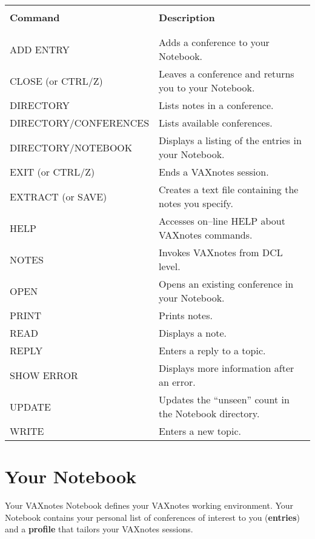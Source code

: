 \begin{tabular}{ l l }
& \\
\hline
& \\
{\large \bf Command}  & {\large \bf Description} \\
& \\
\hline
& \\
ADD ENTRY                &Adds a conference to your Notebook.\\
CLOSE (or CTRL/Z)        &Leaves a conference and returns you to your Notebook.\\
DIRECTORY                &Lists notes in a conference.\\
DIRECTORY/CONFERENCES    &Lists available conferences.\\
DIRECTORY/NOTEBOOK       &Displays a listing of the entries in your Notebook.\\
EXIT (or CTRL/Z)         &Ends a VAXnotes session.\\
EXTRACT (or SAVE)        &Creates a text file containing the notes you specify.\\
HELP                     &Accesses on--line HELP about VAXnotes commands.\\
NOTES                    &Invokes VAXnotes from DCL level.\\
OPEN                     &Opens an existing conference in your Notebook.\\
PRINT                    &Prints notes.\\
READ                     &Displays a note.\\
REPLY                    &Enters a reply to a topic.\\
SHOW ERROR               &Displays more information after an error.\\
UPDATE                   &Updates the ``unseen'' count in the Notebook directory.\\
WRITE                    &Enters a new topic.\\

\end{tabular}

\section {Your Notebook}

Your VAXnotes Notebook defines your VAXnotes working environment. Your Notebook
contains your personal list of conferences of interest to you ({\bf entries})
and a {\bf profile} that tailors your VAXnotes sessions. 

